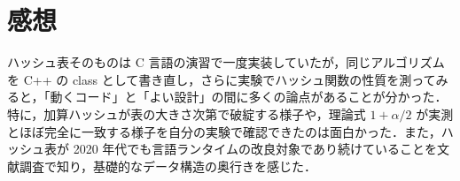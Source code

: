 \section{感想}

ハッシュ表そのものは C 言語の演習で一度実装していたが，同じアルゴリズムを C++ の class として書き直し，さらに実験でハッシュ関数の性質を測ってみると，「動くコード」と「よい設計」の間に多くの論点があることが分かった．特に，加算ハッシュが表の大きさ次第で破綻する様子や，理論式 $1+\alpha/2$ が実測とほぼ完全に一致する様子を自分の実験で確認できたのは面白かった．また，ハッシュ表が 2020 年代でも言語ランタイムの改良対象であり続けていることを文献調査で知り，基礎的なデータ構造の奥行きを感じた．
